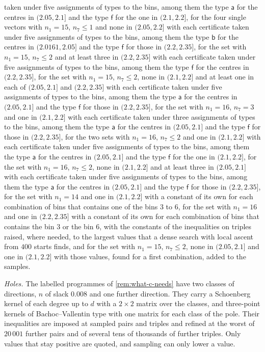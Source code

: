 \documentclass[11pt,reqno]{amsart}
\renewcommand{\_}{\origunderscore\allowbreak}
\numberwithin{equation}{section}
\theoremstyle{plain}
\theoremstyle{definition}
\theoremstyle{remark}
\begin{document}
taken under five assignments of types to the bins, among them the type
$\mathsf a$ for the centres in $(2.05,2.1]$ and the type $\mathsf f$ for
the one in $(2.1,2.2]$, for the four single vectors with $n_1=15$, $n_7\le1$ and none in
$(2.05,2.2]$ with each certificate taken under five assignments of types
to the bins, among them the type $\mathsf b$ for the centres in
$(2.0161,2.05]$ and the type $\mathsf f$ for those in $(2.2,2.35]$, for
the set with $n_1=15$, $n_7\le2$ and at least three in $(2.2,2.35]$ with each certificate taken under five assignments of
types to the bins, among them the type $\mathsf f$ for the centres in
$(2.2,2.35]$, for the set with $n_1=15$, $n_7\le2$, none in $(2.1,2.2]$
and at least one in each of $(2.05,2.1]$ and $(2.2,2.35]$ with each
certificate taken under five assignments of types to the bins, among them
the type $\mathsf a$ for the centres in $(2.05,2.1]$ and the type
$\mathsf f$ for those in $(2.2,2.35]$, for the set
with $n_1=16$, $n_7=3$ and one in $(2.1,2.2]$ with each certificate taken under three
assignments of types to the bins, among them the type $\mathsf a$ for the
centres in $(2.05,2.1]$ and the type $\mathsf f$ for those in $(2.2,2.35]$, for the two sets with $n_1=16$, $n_7\le2$ and one in $(2.1,2.2]$
with each certificate taken under five assignments of types to the bins,
among them the type $\mathsf a$ for the centres in $(2.05,2.1]$ and the
type $\mathsf f$ for the one in $(2.1,2.2]$, for the set with $n_1=16$,
$n_7\le2$, none in $(2.1,2.2]$ and at least three in $(2.05,2.1]$ with
each certificate taken under five assignments of types to the bins, among
them the type $\mathsf a$ for the centres in $(2.05,2.1]$ and the type
$\mathsf f$ for those in $(2.2,2.35]$, for the set with $n_1=14$ and one in $(2.1,2.2]$ with a
constant of its own
for each combination of bins that contains one of the bins $3$ to $6$, for
the set with $n_1=16$ and one in $(2.2,2.35]$ with a constant of its own
for each combination of bins that contains the bin $3$ or the bin $6$,
with the constants of the inequalities on triples raised, where needed, to
the largest values that a dense search with local ascent from $400$ starts
finds, and for the set with $n_1=15$, $n_7\le2$, none in $(2.05,2.1]$ and
one in $(2.1,2.2]$ with those values, found for a first combination, added
to the samples.

\emph{Holes.} The labelled programmes of \cref{rem:what-c-needs} have two
classes of directions, $n$ of slack $0.008$ and one further direction. They
carry a Schoenberg kernel of each degree up to $d$ with a $2\times2$ matrix
over the classes, and three-point kernels of Bachoc--Vallentin type with one
matrix for each class of the pole. Their inequalities are imposed at sampled
pairs and triples and refined at the worst of $20\,001$ further pairs and of
several tens of thousands of further triples. Only values that stay positive
are quoted, and sampling can only lower a value.
\end{document}
